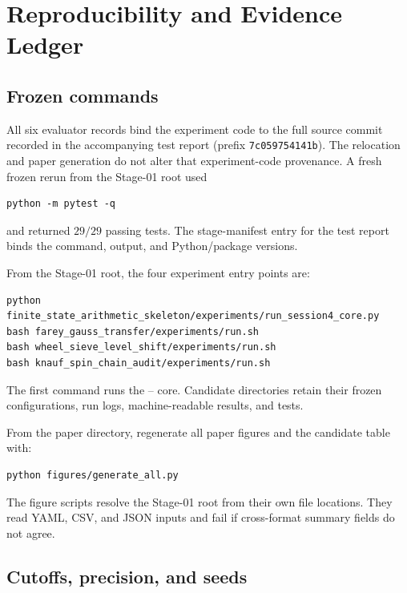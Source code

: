 \section{Reproducibility and Evidence Ledger}
\label{app:reproducibility}

\subsection{Frozen commands}

All six evaluator records bind the experiment code to the full source commit
recorded in the accompanying test report (prefix \texttt{7c059754141b}).
The relocation and paper generation do not alter that experiment-code
provenance.  A fresh frozen
rerun from the Stage-01 root used
\begin{verbatim}
python -m pytest -q
\end{verbatim}
and returned \(29/29\) passing tests.  The stage-manifest entry for the test
report binds the command, output, and Python/package versions.

From the Stage-01 root, the four experiment entry points are:
\begin{verbatim}
python finite_state_arithmetic_skeleton/experiments/run_session4_core.py
bash farey_gauss_transfer/experiments/run.sh
bash wheel_sieve_level_shift/experiments/run.sh
bash knauf_spin_chain_audit/experiments/run.sh
\end{verbatim}
The first command runs the -- core.  Candidate
directories retain their frozen configurations, run logs, machine-readable
results, and tests.

From the paper directory, regenerate all paper figures and the candidate table
with:
\begin{verbatim}
python figures/generate_all.py
\end{verbatim}
The figure scripts resolve the Stage-01 root from their own file locations.
They read YAML, CSV, and JSON inputs and fail if cross-format summary fields do
not agree.

\subsection{Cutoffs, precision, and seeds}

